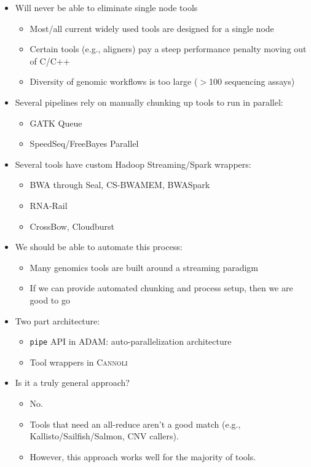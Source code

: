 \documentclass[phd]{ucbthesis}
\begin{document}
\begin{itemize}
\item Will never be able to eliminate single node tools
  \begin{itemize}
  \item Most/all current widely used tools are designed for a single node
  \item Certain tools (e.g., aligners) pay a steep performance penalty moving out of C/C++
  \item Diversity of genomic workflows is too large ($>$100 sequencing assays)
  \end{itemize}
\item Several pipelines rely on manually chunking up tools to run in parallel:
  \begin{itemize}
  \item GATK Queue
  \item SpeedSeq/FreeBayes Parallel
  \end{itemize}
\item Several tools have custom Hadoop Streaming/Spark wrappers:
  \begin{itemize}
  \item BWA through Seal, CS-BWAMEM, BWASpark
  \item RNA-Rail
  \item CrossBow, Cloudburst
  \end{itemize}
\item We should be able to automate this process:
  \begin{itemize}
  \item Many genomics tools are built around a streaming paradigm
  \item If we can provide automated chunking and process setup, then we are good to go
  \end{itemize}
\item Two part architecture:
  \begin{itemize}
  \item \texttt{pipe} API in \textsc{ADAM}: auto-parallelization architecture
  \item Tool wrappers in \textsc{Cannoli}
  \end{itemize}
\item Is it a truly general approach?
  \begin{itemize}
  \item No.
  \item Tools that need an all-reduce aren't a good match (e.g., Kallisto/Sailfish/Salmon,
    CNV callers).
  \item However, this approach works well for the majority of tools.
  \end{itemize}
\end{itemize}
\end{document}
